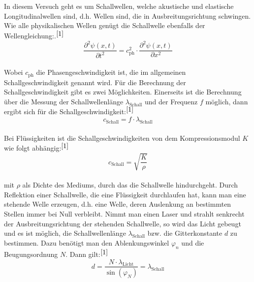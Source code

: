 \documentclass[fontsize=12pt]{scrartcl}
\begin{document}
In diesem Versuch geht es um Schallwellen, welche akustische und elastische Longitudinalwellen sind, d.h. Wellen sind, die in Ausbreitungsrichtung schwingen. Wie alle physikalischen Wellen genügt die Schallwelle ebenfalls der Wellengleichung:.$^{\cite{1}}$
\begin{equation*}
\frac{\partial^2\psi(x,t)}{\partial t^2} = c^2_{\text{ph}}\cdot \frac{\partial^2\psi(x,t)}{\partial x^2}
\end{equation*}\\
Wobei $c_{\text{ph}}$ die Phasengeschwindigkeit ist, die im allgemeinen Schallgeschwindigkeit genannt wird. 
Für die Berechnung der Schallgeschwindigkeit gibt es zwei Möglichkeiten. Einerseits ist die Berechnung über die Messung der Schallwellenlänge $\lambda_{\text{Schall}}$ und der Frequenz $f$ möglich, dann ergibt sich für die Schallgeschwindigkeit:$^{\cite{1}}$
\begin{equation*}
c_{\text{Schall}} =  f \cdot \lambda_{\text{Schall}}
\end{equation*}\\
Bei Flüssigkeiten ist die Schallgeschwindigkeiten von dem Kompressionsmodul $K$ wie folgt abhängig:$^{\cite{1}}$
\begin{equation*}
c_{\text{Schall}} = \sqrt{\frac{K}{\rho}}
\end{equation*}\\
mit $\rho$ als Dichte des Mediums, durch das die Schallwelle hindurchgeht. Durch Reflektion einer Schallwelle, die eine Flüssigkeit durchlaufen hat, kann man eine stehende Welle erzeugen, d.h. eine Welle, deren Auslenkung an bestimmten Stellen immer bei Null verbleibt. Nimmt man einen Laser und strahlt senkrecht der Ausbreitungsrichtung der stehenden Schallwelle, so wird das Licht gebeugt und es ist möglich, die Schallwellenlänge $\lambda_{\text{Schall}}$ bzw. die Gitterkonstante $d$ zu bestimmen. Dazu benötigt man den Ablenkungswinkel $\varphi_n$ und die Beugungsordnung $N$. Dann gilt:$^{\cite{1}}$
\begin{equation*}
d=\frac{ N \cdot \lambda_{\text{Licht}}}{\sin(\varphi_N)}=\lambda_{\text{Schall}}
\end{equation*}


\newpage
\end{document}
